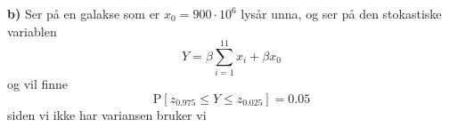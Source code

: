 \documentclass{report}
\newcommand{\bbrack}[1]{\left[ #1 \right]}
\newcommand{\Prob}[1]{\text{P} \bbrack{ #1 }}
\begin{document}
\textbf{b)}
Ser på en galakse som er $x_{0} = 900\cdot 10^{6}$ lysår unna, og ser på den stokastiske variablen
\begin{equation}
  \label{eq:35}
  Y = \beta \sum_{i=1}^{11} x_{i} + \beta x_{0}
\end{equation}
og vil finne
\begin{equation}
  \label{eq:36}
  \Prob{ z_{0.975} \leq Y \leq z_{0.025}} = 0.05
\end{equation}
siden vi ikke har variansen bruker vi
\end{document}
